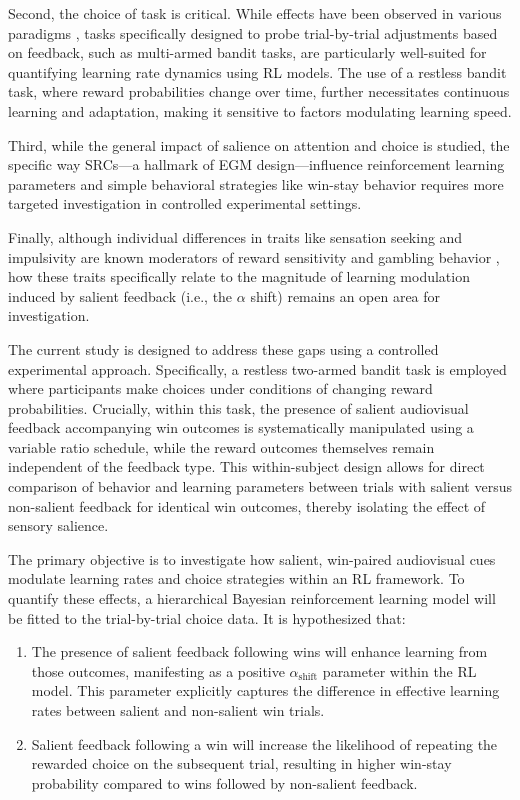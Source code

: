 Second, the choice of task is critical. While effects have been observed in various paradigms \citep{cherkasova2018, mereu2010}, tasks specifically designed to probe trial-by-trial adjustments based on feedback, such as multi-armed bandit tasks, are particularly well-suited for quantifying learning rate dynamics using RL models. The use of a restless bandit task, where reward probabilities change over time, further necessitates continuous learning and adaptation, making it sensitive to factors modulating learning speed.

Third, while the general impact of salience on attention and choice is studied, the specific way SRCs—a hallmark of EGM design—influence reinforcement learning parameters and simple behavioral strategies like win-stay behavior requires more targeted investigation in controlled experimental settings.

Finally, although individual differences in traits like sensation seeking and impulsivity are known moderators of reward sensitivity and gambling behavior \citep{hawes2017, pauli2025}, how these traits specifically relate to the magnitude of learning modulation induced by salient feedback (i.e., the $\alpha$ shift) remains an open area for investigation.

The current study is designed to address these gaps using a controlled experimental approach. Specifically, a restless two-armed bandit task is employed where participants make choices under conditions of changing reward probabilities. Crucially, within this task, the presence of salient audiovisual feedback accompanying win outcomes is systematically manipulated using a variable ratio schedule, while the reward outcomes themselves remain independent of the feedback type. This within-subject design allows for direct comparison of behavior and learning parameters between trials with salient versus non-salient feedback for identical win outcomes, thereby isolating the effect of sensory salience.

The primary objective is to investigate how salient, win-paired audiovisual cues modulate learning rates and choice strategies within an RL framework. To quantify these effects, a hierarchical Bayesian reinforcement learning model will be fitted to the trial-by-trial choice data. It is hypothesized that:

\begin{enumerate}
\item The presence of salient feedback following wins will enhance learning from those outcomes, manifesting as a positive $\alpha_{\text{shift}}$ parameter within the RL model. This parameter explicitly captures the difference in effective learning rates between salient and non-salient win trials.

\item Salient feedback following a win will increase the likelihood of repeating the rewarded choice on the subsequent trial, resulting in higher win-stay probability compared to wins followed by non-salient feedback.
\end{enumerate}

